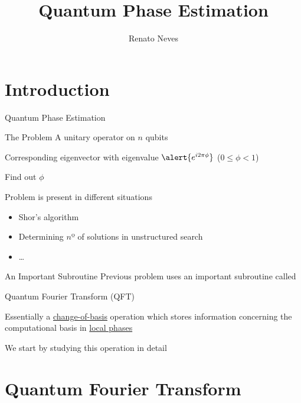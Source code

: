 \documentclass{beamer}
\author[Renato Neves]{Renato Neves}
\date{}
\begin{document}
\title{Quantum Phase Estimation}

\frame[plain]{\titlepage}

\section{Introduction}

\begin{frame}{Quantum Phase Estimation}
        \begin{block}{The Problem}
                A unitary operator on $n$ qubits

                Corresponding eigenvector with eigenvalue $\alert{e^{i 2 \pi
                \phi}}$ ($0 \leq \phi < 1$)

                Find out $\phi$
        \end{block}

        \pause
        Problem is present in different situations
        \begin{itemize}
                \item Shor's algorithm
                \item Determining $n$º of solutions in unstructured search
                \item \dots
        \end{itemize}
\end{frame}        

\begin{frame}{An Important Subroutine}
        Previous problem uses an important subroutine called
        \begin{center}
                \alert{Quantum Fourier Transform (QFT)}
        \end{center}

        Essentially a \alert{\underline{change-of-basis}} operation which
        stores information concerning the computational basis in
        \alert{\underline{local phases}}

        \pause
        We start by studying this operation in detail
\end{frame}

\section{Quantum Fourier Transform}
\end{document}

